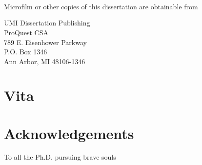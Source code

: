 \documentclass[12pt,draft,letterpaper]{report}
\newcommand{\thesisdedication}{\todo{TODO}To all the Ph.D. pursuing brave souls}
\begin{document}
\noindent
\makebox[\textwidth]{\hfill\makebox[3in]{\hrulefill}}\\
\makebox[\textwidth]{\hfill\makebox[3in]{\rule[-4pt]{2in}{1pt}}}\\
\\

\doublespacing

\begin{center}
Microfilm or other copies of this dissertation are obtainable from
\vspace{4in}

UMI Dissertation Publishing\\
ProQuest CSA\\
789 E. Eisenhower Parkway\\
P.O. Box 1346\\
Ann Arbor, MI 48106-1346

\end{center}
\newpage

\section*{Vita}

\newpage



\section*{Acknowledgements}

\newpage

\vspace*{\fill}
\begin{center}
  \thesisdedication%
\end{center}
\vfill
\newpage


\end{document}
